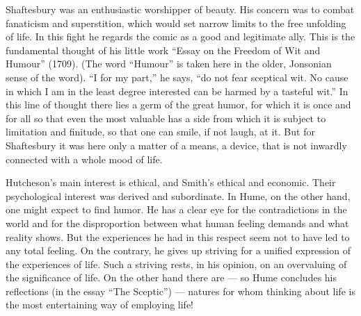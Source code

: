 \documentclass[12pt]{book}
\newcommand{\opage}[1]{\marginnote{\footnotesize\textit{[#1]}}}
\begin{document}
Shaftesbury was an enthusiastic worshipper of beauty. His concern was to combat fanaticism and
superstition, which would set narrow limits to the free unfolding of life. In this fight he regards
the comic as a good and legitimate ally. This is \opage{158}the fundamental thought of his little
work ``Essay on the Freedom of Wit and Humour'' (1709). (The word ``Humour'' is taken here in the
older, Jonsonian sense of the word). ``I for my part,'' he says, ``do not fear sceptical wit. No
cause in which I am in the least degree interested can be harmed by a tasteful wit.'' In this line
of thought there lies a germ of the great humor, for which it is once and for all so that even the
most valuable has a side from which it is subject to limitation and finitude, so that one can smile,
if not laugh, at it. But for Shaftesbury it was here only a matter of a means, a device, that is
not inwardly connected with a whole mood of life.

Hutcheson's main interest is ethical, and Smith's ethical and economic. Their psychological interest
was derived and subordinate. In Hume, on the other hand, one might expect to find humor. He has a
clear eye for the contradictions in the world and for the disproportion between what human feeling
demands and what reality shows. But the experiences he had in this respect seem not to have led to
any total feeling. On the contrary, he gives up striving for a unified expression of the experiences
of life. Such a striving rests, in his opinion, on an overvaluing of the significance of life. On
the other hand there are --- so Hume concludes his reflections (in the essay ``The Sceptic'') ---
natures for whom thinking about life is the most entertaining way of employing life!
\end{document}
